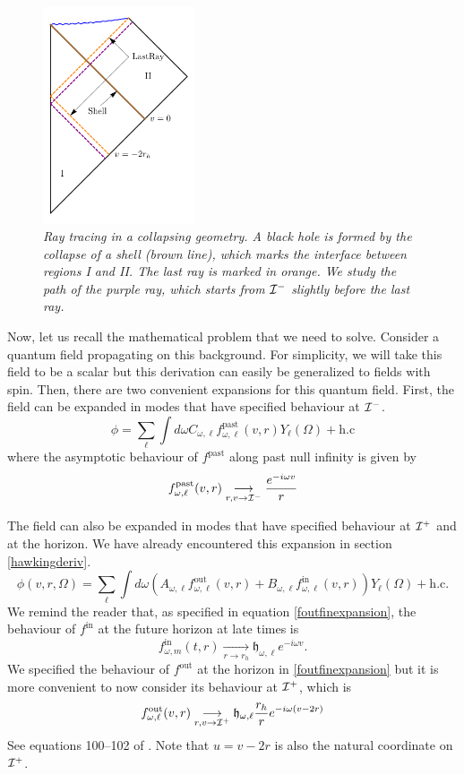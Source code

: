 \documentclass[12pt]{article}
\def\fpast{f^{\text{past}}}
\def\fout{f^{\text{out}}}
\def\fin{f^{\text{in}}}
\def\white{\mathfrak{h}}
\newcommand{\be}{\begin{equation}}
\newcommand{\ee}{\end{equation}}
\def \scrip{{\cal I}^{+}}
\def \scrim{{\cal I}^{-}}
\begin{document}
\begin{figure}[!ht]
\begin{center}
\includegraphics[width=0.4\textwidth]{raytracing_new.pdf}
\caption{\em Ray tracing in a collapsing geometry. A black hole is formed
by the collapse of a  shell (brown line), which marks the interface between
regions {\rm I} and {\rm II}. The last ray is marked in orange. We study the path of the purple ray, which starts from $\scrim$ slightly before the last ray.  \label{figraytracing}}
\end{center}
\end{figure}


Now, let us recall the mathematical problem that we need to solve.  Consider a quantum field propagating on this background. For simplicity, we will take this field to be a scalar but this derivation can easily be generalized to fields with spin.   Then, there are two convenient expansions for this quantum field. First, the field can be expanded  in modes that have specified behaviour at $\scrim$.
\be
\phi = \sum_{\ell} \int d \omega  C_{\omega, \ell} \fpast_{\omega, \ell}(v, r) Y_{\ell}(\Omega) + \text{h.c}
\ee
where the asymptotic behaviour of $\fpast$ along past null infinity is given by
\be
\label{pastmodes}
\fpast_{\omega, \ell}(v,r) \underset{r,v \rightarrow {\cal I}^{-}}{\longrightarrow} {e^{-i \omega v} \over r}
\ee

The field can also be expanded in modes that have specified behaviour at $\scrip$ and at the horizon. We have already encountered this expansion  in section \ref{hawkingderiv}.
\be
\label{futuremodes}
\phi(v, r, \Omega) = \sum_{\ell} \int {d \omega}  \left(A_{\omega, \ell} \fout_{\omega, \ell}(v,r) + B_{\omega,\ell} \fin_{\omega,\ell}(v, r) \right) Y_{\ell}(\Omega) + \text{h.c}.
\ee
We remind the reader that, as specified in equation \eqref{foutfinexpansion}, the behaviour of $\fin$ at the future horizon at late times is
\be
\fin_{\omega, m}(t,r) \underset{r \rightarrow r_h}{\longrightarrow} \white_{\omega, \ell} e^{-i \omega v}.
\ee
 We specified the behaviour of $\fout$ at the horizon in \eqref{foutfinexpansion} but it is more convenient to now consider its behaviour at $\scrip$, which is
\be
\fout_{\omega, \ell}(v,r) \underset{r,v \rightarrow {\cal I}^{+}}{\longrightarrow} \white_{\omega, \ell} {r_h \over r} {e^{-i \omega (v - 2 r)}}
\ee
See equations 100--102 of \cite{dewitt1975quantum}. Note that $u = v - 2 r$ is also the natural coordinate on $\scrip$.
\end{document}
